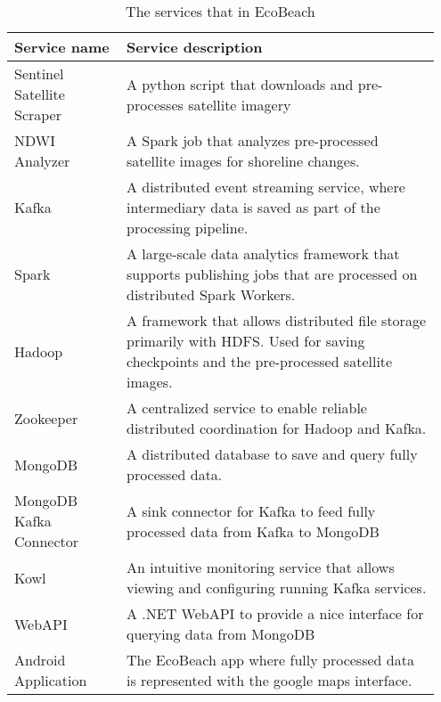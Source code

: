 \begin{table}[]
    \centering
    \begin{tabular}{| p{0.25\linewidth} | p{0.7\linewidth} |}
        \hline
        \textbf{Service name}      & \textbf{Service description}                                                                                                              \\ \hline
        Sentinel Satellite Scraper & A python script that downloads and pre-processes satellite imagery                                                                        \\\hline
        NDWI Analyzer              & A Spark job that analyzes pre-processed satellite images for shoreline changes.                                        \\\hline
        Kafka                      & A distributed event streaming service, where intermediary data is saved as part of the processing pipeline.                               \\\hline
        Spark                      & A large-scale data analytics framework that supports publishing jobs that are processed on distributed Spark Workers.                     \\\hline
        Hadoop                     & A framework that allows distributed file storage primarily with HDFS. Used for saving checkpoints and the pre-processed satellite images. \\\hline
        Zookeeper                  & A centralized service to enable reliable distributed coordination for Hadoop and Kafka.                                                   \\\hline
        MongoDB                    & A distributed database to save and query fully processed data.                                                                           \\\hline
        MongoDB Kafka Connector    & A sink connector for Kafka to feed fully processed data from Kafka to MongoDB                                                             \\\hline
        Kowl                       & An intuitive monitoring service that allows viewing and configuring running Kafka services.                                           \\\hline
        WebAPI                     & A .NET WebAPI to provide a nice interface for querying data from MongoDB                                                                  \\\hline
        Android Application        & The EcoBeach app where fully processed data is represented with the google maps interface.                                                \\\hline
    \end{tabular}
    \caption{The services that in EcoBeach}
    \label{tab:ecobeach-services}
\end{table}

